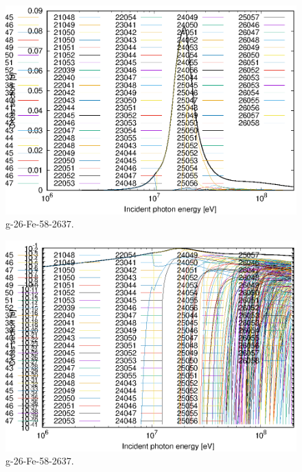 \begin{figure}
 \includegraphics[width=\linewidth]{eps/g_26-Fe-58_2637.eps}
  \caption{g-26-Fe-58-2637.}
\end{figure}
\begin{figure}
 \includegraphics[width=\linewidth]{eps-log/g_26-Fe-58_2637.eps}
 \caption{g-26-Fe-58-2637.}
\end{figure}
\newpage \clearpage


